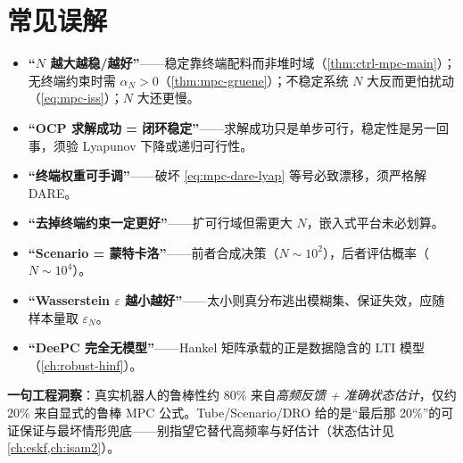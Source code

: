 \section*{常见误解}
\begin{itemize}
  \item \textbf{“$N$ 越大越稳/越好”}——稳定靠终端配料而非堆时域（\cref{thm:ctrl-mpc-main}）；无终端约束时需 $\alpha_N>0$（\cref{thm:mpc-gruene}）；不稳定系统 $N$ 大反而更怕扰动（\cref{eq:mpc-iss}）；$N$ 大还更慢。
  \item \textbf{“OCP 求解成功 = 闭环稳定”}——求解成功只是单步可行，稳定性是另一回事，须验 Lyapunov 下降或递归可行性。
  \item \textbf{“终端权重可手调”}——破坏 \cref{eq:mpc-dare-lyap} 等号必致漂移，须严格解 DARE。
  \item \textbf{“去掉终端约束一定更好”}——扩可行域但需更大 $N$，嵌入式平台未必划算。
  \item \textbf{“Scenario = 蒙特卡洛”}——前者合成决策（$N\sim10^2$），后者评估概率（$N\sim10^4$）。
  \item \textbf{“Wasserstein $\varepsilon$ 越小越好”}——太小则真分布逃出模糊集、保证失效，应随样本量取 $\varepsilon_N$。
  \item \textbf{“DeePC 完全无模型”}——Hankel 矩阵承载的正是数据隐含的 LTI 模型（\cref{ch:robust-hinf}）。
\end{itemize}

\begin{insight}
\textbf{一句工程洞察}：真实机器人的鲁棒性约 80\% 来自\emph{高频反馈 + 准确状态估计}，仅约 20\% 来自显式的鲁棒 MPC 公式。Tube/Scenario/DRO 给的是“最后那 20\%”的可证保证与最坏情形兜底——别指望它替代高频率与好估计（状态估计见 \cref{ch:eskf,ch:isam2}）。
\end{insight}


